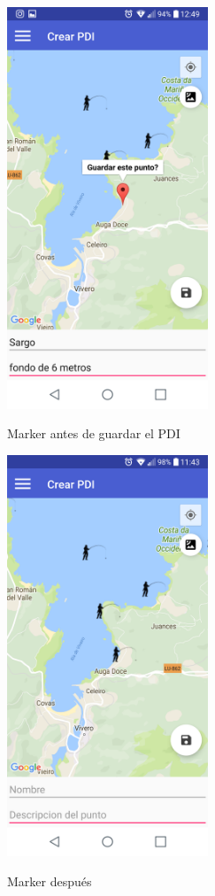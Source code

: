  
	\begin{figure}
\begin{minipage}[b]{0.5\linewidth} %
\centering
\includegraphics[width=6cm]{capturamovil/pdiguardar.png}
 \label{figura1}
\caption{Marker antes de guardar el PDI}

\end{minipage}
\hspace{0.5cm} %
\begin{minipage}[b]{0.5\linewidth}
\centering
\includegraphics[width=6cm]{capturamovil/pdiguardar2.png}
 \label{figura2}
\caption{Marker después }

\end{minipage}
		\label{fig:marker}

\end{figure} 
 
